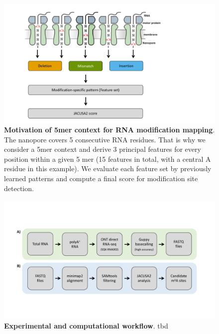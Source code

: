 \documentclass[times, 11pt, a4paper]{article}
\begin{document}
\begin{figure}[h!]
    \includegraphics[width = 1\textwidth]{Figure2.pdf}
  \caption{\textbf{Motivation of 5mer context for RNA modification mapping}. The nanopore covers 5 consecutive RNA residues. That is why we consider a 5mer context and derive 3 principal features for every position within a given 5 mer (15 features in total, with a central A residue in this example). We evaluate each feature set by previously learned patterns and compute a final score for modification site detection.}
  \label{fig:5mer}
      \end{figure}
\newpage

\begin{figure}[h!]
    \includegraphics[width = 1\textwidth]{Figure3.pdf}
  \caption{\textbf{Experimental and computational workflow}. tbd}
  \label{fig:workflow}
      \end{figure}
\newpage
\end{document}

